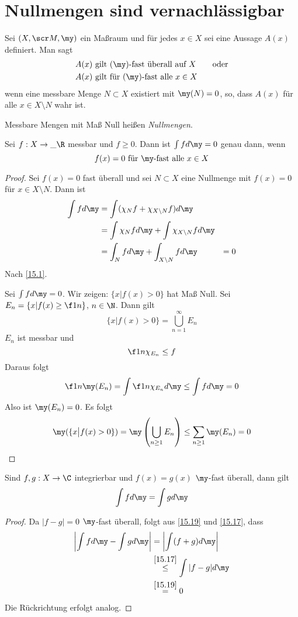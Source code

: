\documentclass[a4paper,10pt]{scrbook}
\begin{document}
\section{Nullmengen sind vernachlässigbar}

\begin{df*}
	Sei $(X, \scr M, \my)$ ein Maßraum und für jedes $x\in X$ sei eine Aussage $A(x)$ definiert.
	Man sagt
	\begin{align*}
		&A(x) \text{ gilt ($\my$)-fast überall auf $X$} \qquad \text{oder}\\
		&A(x) \text{ gilt für ($\my$)-fast alle $x\in X$}
	\end{align*}
	wenn eine messbare Menge $N\subset X$ existiert mit $\my(N) = 0$, so, dass $A(x)$ für alle $x\in X\setminus N$ wahr ist.

	Messbare Mengen mit Maß Null heißen \emph{Nullmengen}.
\end{df*}

\begin{thm}
	\label{15.19}
	Sei $f:X\to \_\R$ messbar und $f\ge 0$.
	Dann ist $\int fd\my = 0$ genau dann, wenn
	\[
		f(x) = 0 \text{ für $\my$-fast alle $x\in X$}
	\]
	\begin{proof}
		Sei $f(x)=0$ fast überall und sei $N\subset X$ eine Nullmenge mit $f(x)=0$ für $x\in X\setminus N$.
		Dann ist
		\begin{align*}
			\int fd\my &= \int (\chi_N f + \chi_{X\setminus N}f)d\my\\
								   &= \int \chi_N fd\my + \int \chi_{X\setminus N}fd\my\\
							 &=\int_N fd\my + \int_{X\setminus N}fd\my
			&=0
		\end{align*}
		Nach \ref{15.1}.

		Sei $\int fd\my = 0$.
		Wir zeigen: $\{x\big| f(x) > 0\}$ hat Maß Null.
		Sei $E_n = \{x| f(x) \ge \f 1n\}$, $n\in \N$.
		Dann gilt
		\[
			\{x\big| f(x) > 0\} = \bigcup_{n=1}^\infty E_n
		\]
		$E_n$ ist messbar und
		\[
			\f 1n \chi_{E_n} \le f
		\]
		Daraus folgt
		\[
			\f 1n \my(E_n) = \int \f 1n \chi_{E_n}d\my \le \int f d\my = 0
		\]
		Also ist $\my(E_n) = 0$.		
		Es folgt
		\[
			\my(\{x\big |f(x)>0\}) = \my\left( \bigcup_{n\ge 1}E_n\right) \le \sum_{n\ge 1} \my(E_n) = 0
		\]
	\end{proof}
\end{thm}


\begin{kor}
	\label{15.20}
	Sind $f,g:X\to \C$ integrierbar und $f(x)=g(x)$ $\my$-fast überall, dann gilt
	\[
		\int fd\my = \int gd\my
	\]
	\begin{proof}
		Da $|f-g|=0$ $\my$-fast überall, folgt aus \ref{15.19} und \ref{15.17}, dass
		\begin{align*}
			\left|\int fd\my - \int gd\my \right| &= \left| \int(f+g) d\my\right|\\
																																	  &\stackrel{\ref{15.17}}\le \int |f-g| d\my \\
																										   &\stackrel{\ref{15.19}}= 0
		\end{align*}
		Die Rückrichtung erfolgt analog.
	\end{proof}
\end{kor}
\end{document}
